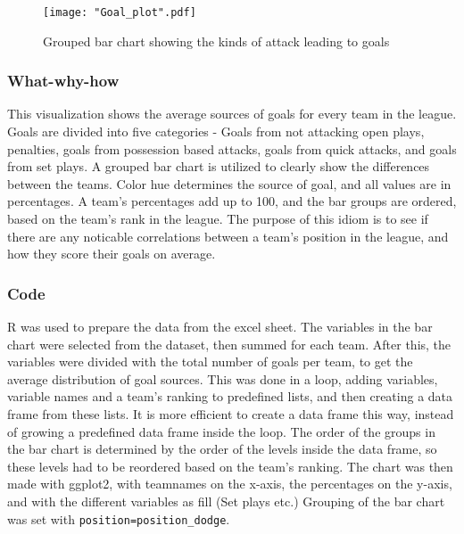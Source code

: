 \documentclass[Report.tex]{subfiles}
\begin{document}
\begin{figure}
\center
\texttt{[image: "Goal\_plot".pdf]}
\caption{Grouped bar chart showing the kinds of attack leading to goals}
\label{Fig:Goal_plot}
\end{figure}

\subsubsection{What-why-how}
This visualization shows the average sources of goals for every team in the
league. Goals are divided into five categories - Goals from not attacking open
plays, penalties, goals from possession based attacks, goals from quick attacks,
and goals from set plays. 
A grouped bar chart is utilized to clearly show the differences between the
teams. Color hue determines the source of goal, and all values are in
percentages. A team's percentages add up to 100, and the bar groups are ordered,
based on the team's rank in the league. 
The purpose of this idiom is to see if there are any noticable correlations
between a team's position in the league, and how they score their goals on
average. 

\subsubsection{Code}
R was used to prepare the data from the excel sheet. The variables in the bar
chart were selected from the dataset, then summed for each team. After this, the
variables were divided with the total number of goals per team, to get the
average distribution of goal sources. 
This was done in a loop, adding variables, variable names and a team's ranking
to predefined lists, and then creating a data frame from these lists. It is more
efficient to create a data frame this way, instead of growing a predefined data
frame inside the loop. 
The order of the groups in the bar chart is determined by the order of the
levels inside the data frame, so these levels had to be reordered based on the
team's ranking.
The chart was then made with ggplot2, with teamnames on the x-axis, the
percentages on the y-axis, and with the different variables as fill (Set plays
etc.)
Grouping of the bar chart was set with \verb!position=position_dodge!. 
\end{document}
